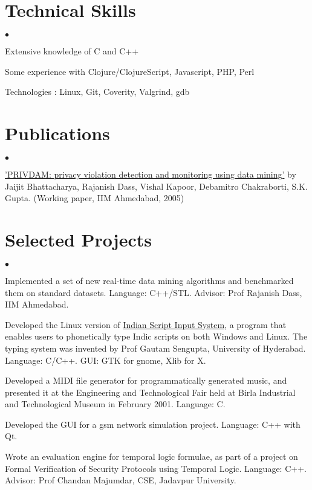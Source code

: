\documentclass[margin,line]{res}
\newenvironment{list1}{
  \begin{list}{$\bullet$}{%
      \setlength{\itemsep}{0in}
      \setlength{\parsep}{0in} \setlength{\parskip}{0in}
      \setlength{\topsep}{0in} \setlength{\partopsep}{0in}
      \setlength{\leftmargin}{0.17in}}}{\end{list}}
\begin{document}
\begin{resume}
\section{\sc Technical Skills}
\begin{list1}
	\item Extensive knowledge of C and C++
	\item Some experience with Clojure/ClojureScript, Javascript, PHP, Perl
	\item Technologies : Linux, Git, Coverity, Valgrind, gdb
\end{list1}

\section{\sc Publications}
\begin{list1}
	\item \href{https://www.researchgate.net/publication/229005723_PRIVDAM_Privacy_Violation_Detection_and_Monitoring_Using_Data_Mining}{'PRIVDAM: privacy violation detection and monitoring using data mining'}
by Jaijit Bhattacharya, Rajanish Dass, Vishal Kapoor, Debamitro Chakraborti, S.K. Gupta.
(Working paper, IIM Ahmedabad, 2005)
\end{list1}

\section{\sc Selected Projects}
\begin{list1}
	\item Implemented a set of new real-time data mining algorithms and benchmarked them on standard datasets. Language: C++/STL. Advisor: Prof Rajanish Dass, IIM Ahmedabad.
	\item Developed the Linux version of  \href{http://www.bangla.name/isis}{Indian Script Input System}, a program that enables users to phonetically type Indic scripts on both Windows and Linux. The typing system was invented by Prof Gautam Sengupta, University of Hyderabad. Language: C/C++. GUI: GTK for gnome, Xlib for X.
	\item Developed a MIDI file generator for programmatically generated music, and presented it at the Engineering and Technological Fair held at Birla Industrial and Technological Museum in February 2001. Language: C.
	\item Developed the GUI for a gsm network simulation project. Language: C++ with Qt.
	\item Wrote an evaluation engine for temporal logic formulae, as part of a project on Formal Verification of Security Protocols using Temporal Logic. Language: C++. Advisor: Prof Chandan Majumdar, CSE, Jadavpur University.
\end{list1}


\end{resume}
\end{document}
